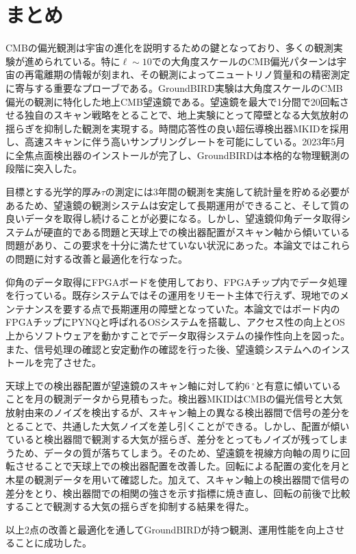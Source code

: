 \chapter{まとめ}
\label{chapter6}

CMBの偏光観測は宇宙の進化を説明するための鍵となっており、多くの観測実験が進められている。特に$\ell\sim 10$での大角度スケールのCMB偏光パターンは宇宙の再電離期の情報が刻まれ、その観測によってニュートリノ質量和の精密測定に寄与する重要なプローブである。GroundBIRD実験は大角度スケールのCMB偏光の観測に特化した地上CMB望遠鏡である。望遠鏡を最大で1分間で20回転させる独自のスキャン戦略をとることで、地上実験にとって障壁となる大気放射の揺らぎを抑制した観測を実現する。時間応答性の良い超伝導検出器MKIDを採用し、高速スキャンに伴う高いサンプリングレートを可能にしている。2023年5月に全焦点面検出器のインストールが完了し、GroundBIRDは本格的な物理観測の段階に突入した。

目標とする光学的厚み$\tau$の測定には3年間の観測を実施して統計量を貯める必要があるため、望遠鏡の観測システムは安定して長期運用ができること、そして質の良いデータを取得し続けることが必要になる。しかし、望遠鏡仰角データ取得システムが硬直的である問題と天球上での検出器配置がスキャン軸から傾いている問題があり、この要求を十分に満たせていない状況にあった。本論文ではこれらの問題に対する改善と最適化を行なった。

仰角のデータ取得にFPGAボードを使用しており、FPGAチップ内でデータ処理を行っている。既存システムではその運用をリモート主体で行えず、現地でのメンテナンスを要する点で長期運用の障壁となっていた。本論文ではボード内のFPGAチップにPYNQと呼ばれるOSシステムを搭載し、アクセス性の向上とOS上からソフトウェアを動かすことでデータ取得システムの操作性向上を図った。また、信号処理の確認と安定動作の確認を行った後、望遠鏡システムへのインストールを完了させた。

天球上での検出器配置が望遠鏡のスキャン軸に対して約$\SI{6}{^{\circ}}$と有意に傾いていることを月の観測データから見積もった。検出器MKIDはCMBの偏光信号と大気放射由来のノイズを検出するが、スキャン軸上の異なる検出器間で信号の差分をとることで、共通した大気ノイズを差し引くことができる。しかし、配置が傾いていると検出器間で観測する大気が揺らぎ、差分をとってもノイズが残ってしまうため、データの質が落ちてしまう。そのため、望遠鏡を視線方向軸の周りに回転させることで天球上での検出器配置を改善した。回転による配置の変化を月と木星の観測データを用いて確認した。加えて、スキャン軸上の検出器間で信号の差分をとり、検出器間での相関の強さを示す指標に焼き直し、回転の前後で比較することで観測する大気の揺らぎを抑制する結果を得た。

以上2点の改善と最適化を通してGroundBIRDが持つ観測、運用性能を向上させることに成功した。
